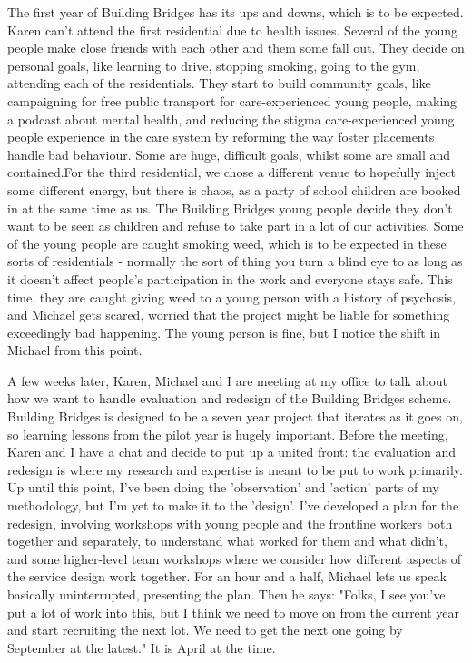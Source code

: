 The first year of Building Bridges has its ups and downs, which is to be expected. Karen can't attend the first residential due to health issues. Several of the young people make close friends with each other and them some fall out. They decide on personal goals, like learning to drive, stopping smoking, going to the gym, attending each of the residentials. They start to build community goals, like campaigning for free public transport for care-experienced young people, making a podcast about mental health, and reducing the stigma care-experienced young people experience in the care system by reforming the way foster placements handle bad behaviour. Some are huge, difficult goals, whilst some are small and contained.For the third residential, we chose a different venue to hopefully inject some different energy, but there is chaos, as a party of school children are booked in at the same time as us.  The Building Bridges young people decide they don't want to be seen as children and refuse to take part in a lot of our activities. Some of the young people are caught smoking weed, which is to be expected in these sorts of residentials - normally the sort of thing you turn a blind eye to as long as it doesn't affect people's participation in the work and everyone stays safe. This time, they are caught giving weed to a young person with a history of psychosis, and Michael gets scared, worried that the project might be liable for something exceedingly bad happening. The young person is fine, but I notice the shift in Michael from this point.

A few weeks later, Karen, Michael and I are meeting at my office to talk about how we want to handle evaluation and redesign of the Building Bridges scheme. Building Bridges is designed to be a seven year project that iterates as it goes on, so learning lessons from the pilot year is hugely important. Before the meeting, Karen and I have a chat and decide to put up a united front: the evaluation and redesign is where my research and expertise is meant to be put to work primarily. Up until this point, I've been doing the 'observation' and 'action' parts of my methodology, but I'm yet to make it to the 'design'. I've developed a plan for the redesign, involving workshops with young people and the frontline workers both together and separately, to understand what worked for them and what didn't, and some higher-level team workshops where we consider how different aspects of the service design work together. For an hour and a half, Michael lets us speak basically uninterrupted, presenting the plan. Then he says: "Folks, I see you've put a lot of work into this, but I think we need to move on from the current year and start recruiting the next lot. We need to get the next one going by September at the latest." It is April at the time.

